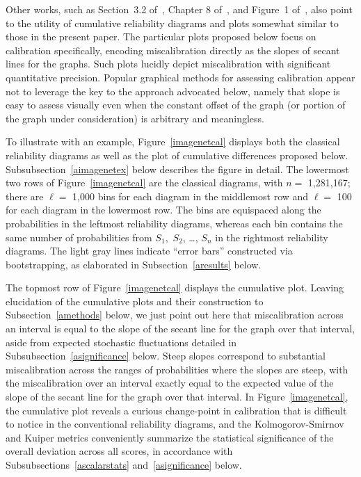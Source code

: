 \documentclass{article}
\begin{document}
Other works, such as Section~3.2 of~\cite{gneiting-balabdaoui-raftery},
Chapter 8 of~\cite{wilks}, and Figure~1
of~\cite{gupta-rahimi-ajanthan-mensink-sminchisescu-hartley},
also point to the utility of cumulative reliability diagrams and plots
somewhat similar to those in the present paper.
The particular plots proposed below focus on calibration specifically,
encoding miscalibration directly as the slopes of secant lines for the graphs.
Such plots lucidly depict miscalibration
with significant quantitative precision.
Popular graphical methods for assessing calibration appear not to leverage
the key to the approach advocated below, namely that slope is easy to assess
visually even when the constant offset of the graph (or portion of the graph
under consideration) is arbitrary and meaningless.

To illustrate with an example,
Figure~\ref{imagenetcal} displays both the classical reliability diagrams
as well as the plot of cumulative differences proposed below.
Subsubsection~\ref{aimagenetex} below describes the figure in detail.
The lowermost two rows of Figure~\ref{imagenetcal} are the classical diagrams,
with $n =$ 1,281,167;
there are $\ell =$ 1,000 bins for each diagram in the middlemost row
and $\ell =$ 100 for each diagram in the lowermost row.
The bins are equispaced along the probabilities
in the leftmost reliability diagrams,
whereas each bin contains the same number of probabilities
from $S_1$,~$S_2$, \dots, $S_n$ in the rightmost reliability diagrams.
The light gray lines indicate ``error bars'' constructed via bootstrapping,
as elaborated in Subsection~\ref{aresults} below.

The topmost row of Figure~\ref{imagenetcal} displays the cumulative plot.
Leaving elucidation of the cumulative plots and their construction
to Subsection~\ref{amethods} below,
we just point out here that miscalibration across an interval
is equal to the slope of the secant line for the graph over that interval,
aside from expected stochastic fluctuations
detailed in Subsubsection~\ref{asignificance} below.
Steep slopes correspond to substantial miscalibration across the ranges
of probabilities where the slopes are steep, with the miscalibration
over an interval exactly equal to the expected value of the slope
of the secant line for the graph over that interval.
In Figure~\ref{imagenetcal},
the cumulative plot reveals a curious change-point in calibration
that is difficult to notice in the conventional reliability diagrams,
and the Kolmogorov-Smirnov and Kuiper metrics conveniently summarize
the statistical significance of the overall deviation across all scores,
in accordance
with Subsubsections~\ref{ascalarstats} and~\ref{asignificance} below.
\end{document}
